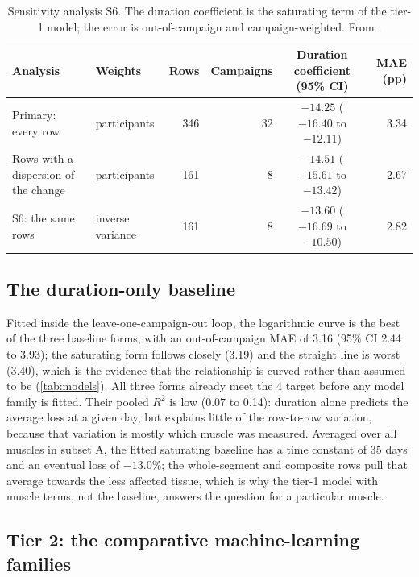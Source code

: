 \begin{table}[htbp]
\centering
\caption[Sensitivity analysis S6]{Sensitivity analysis S6. The duration coefficient is the saturating term of the
tier-1 model; the error is out-of-campaign and campaign-weighted. From .}
\label{tab:s6}
\small
\begin{tabularx}{\linewidth}{@{}Y l r r c r@{}}
\toprule
Analysis & Weights & Rows & Campaigns & Duration coefficient (95\% CI) & MAE (pp) \\
\midrule
Primary: every row & participants & 346 & 32 & $-14.25$ ($-16.40$ to $-12.11$) & 3.34 \\
Rows with a dispersion of the change & participants & 161 & 8 & $-14.51$ ($-15.61$ to $-13.42$) & 2.67 \\
S6: the same rows & inverse variance & 161 & 8 & $-13.60$ ($-16.69$ to $-10.50$) & 2.82 \\
\bottomrule
\end{tabularx}
\end{table}

\subsection{The duration-only baseline}
\label{sec:results-baseline}

Fitted inside the leave-one-campaign-out loop, the logarithmic curve is the best of the three baseline forms, with
an out-of-campaign MAE of 3.16\pp{} (95\% CI 2.44 to 3.93); the saturating form follows closely (3.19\pp) and the
straight line is worst (3.40\pp), which is the evidence that the relationship is curved rather than assumed to be
(\cref{tab:models}). All three forms already meet the 4\pp{} target before any model family is fitted. Their pooled
$R^2$ is low (0.07 to 0.14): duration alone predicts the average loss at a given day, but explains little of the
row-to-row variation, because that variation is mostly which muscle was measured. Averaged over all muscles in
subset A, the fitted saturating baseline has a time constant of 35 days and an eventual loss of $-13.0\%$; the
whole-segment and composite rows pull that average towards the less affected tissue, which is why the tier-1 model
with muscle terms, not the baseline, answers the question for a particular muscle.

\subsection{Tier 2: the comparative machine-learning families}
\label{sec:results-tier2}

